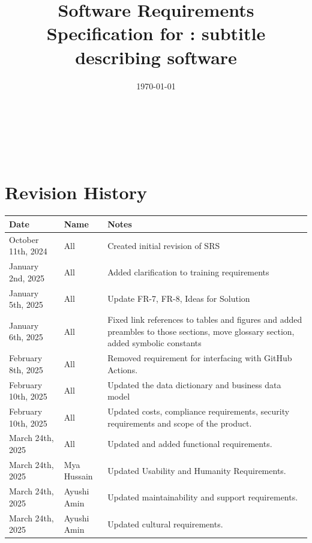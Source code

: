 \documentclass[12pt]{article}
\begin{document}

\title{Software Requirements Specification for \progname: subtitle
describing software}
\author{\authname}
\date{\today}

\maketitle
\thispagestyle{empty}

~\newpage

\tableofcontents

~\newpage

\section*{Revision History}

\begin{tabularx}{\textwidth}{p{3.7cm}p{1.8cm}X}
  \toprule {\textbf{Date}} & {\textbf{Name}} & {\textbf{Notes}}\\
  \midrule
  October 11th, 2024 & All & Created initial revision of SRS\\
  January 2nd, 2025 & All & Added clarification to training requirements\\
  January 5th, 2025 & All & Update FR-7, FR-8, Ideas for Solution \\
  January 6th, 2025 & All & Fixed link references to tables and
  figures and added preambles to those sections, move glossary
  section, added symbolic constants\\
  February 8th, 2025 & All & Removed requirement for interfacing with
  GitHub Actions.\\
  February 10th, 2025 & All & Updated the data dictionary and
  business data model \\
  February 10th, 2025 & All & Updated costs, compliance requirements,
  security requirements and scope of the product. \\
  March 24th, 2025 & All & Updated and added functional requirements. \\
  March 24th, 2025 & Mya Hussain & Updated Usability and Humanity Requirements. \\
  March 24th, 2025 & Ayushi Amin & Updated maintainability and support requirements. \\
  March 24th, 2025 & Ayushi Amin & Updated cultural requirements.
  \bottomrule 
\end{tabularx}

~\\
\end{document}
